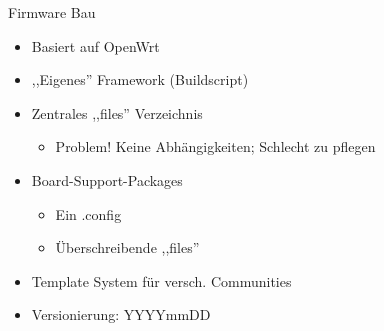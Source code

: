 \begin{frame}{Firmware Bau}
    \begin{itemize}
        \item Basiert auf OpenWrt
        \item ,,Eigenes'' Framework (Buildscript)
        \item Zentrales ,,files'' Verzeichnis
        \begin{itemize}
            \item<2> {\color{red}Problem!} Keine Abhängigkeiten; Schlecht zu pflegen
        \end{itemize}
        \item Board-Support-Packages
        \begin{itemize}
            \item Ein .config
            \item Überschreibende ,,files''
        \end{itemize}
        \item Template System für versch. Communities
        \item Versionierung: YYYYmmDD
    \end{itemize}
\end{frame}

